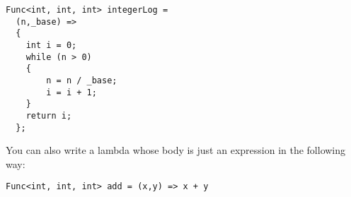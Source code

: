 \begin{lstlisting}
Func<int, int, int> integerLog =
  (n,_base) =>
  {
    int i = 0;
    while (n > 0)
    {
    	n = n / _base;
    	i = i + 1;
    }
    return i;
  };
\end{lstlisting}

You can also write a lambda whose body is just an expression in the following way:

\begin{lstlisting}
Func<int, int, int> add = (x,y) => x + y
\end{lstlisting}
